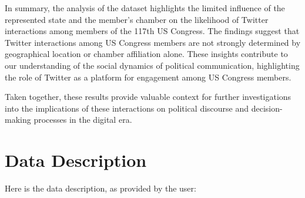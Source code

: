 \documentclass[11pt]{article}
\begin{document}
In summary, the analysis of the dataset highlights the limited influence of the represented state and the member's chamber on the likelihood of Twitter interactions among members of the 117th US Congress. The findings suggest that Twitter interactions among US Congress members are not strongly determined by geographical location or chamber affiliation alone. These insights contribute to our understanding of the social dynamics of political communication, highlighting the role of Twitter as a platform for engagement among US Congress members. 

Taken together, these results provide valuable context for further investigations into the implications of these interactions on political discourse and decision-making processes in the digital era.


\clearpage
\appendix

\section{Data Description} \label{sec:data_description} Here is the data description, as provided by the user:
\end{document}
